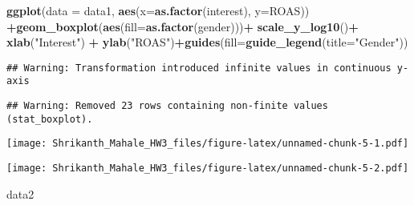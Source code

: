 \documentclass[]{article}
\newenvironment{Shaded}{\begin{snugshade}}{\end{snugshade}}
\newcommand{\KeywordTok}[1]{\textcolor[rgb]{0.13,0.29,0.53}{\textbf{#1}}}
\newcommand{\DataTypeTok}[1]{\textcolor[rgb]{0.13,0.29,0.53}{#1}}
\newcommand{\StringTok}[1]{\textcolor[rgb]{0.31,0.60,0.02}{#1}}
\newcommand{\OperatorTok}[1]{\textcolor[rgb]{0.81,0.36,0.00}{\textbf{#1}}}
\newcommand{\NormalTok}[1]{#1}
\begin{document}
\begin{Shaded}
\begin{Highlighting}[]
\KeywordTok{ggplot}\NormalTok{(}\DataTypeTok{data =}\NormalTok{ data1, }\KeywordTok{aes}\NormalTok{(}\DataTypeTok{x=}\KeywordTok{as.factor}\NormalTok{(interest), }\DataTypeTok{y=}\NormalTok{ROAS)) }\OperatorTok{+}\KeywordTok{geom_boxplot}\NormalTok{(}\KeywordTok{aes}\NormalTok{(}\DataTypeTok{fill=}\KeywordTok{as.factor}\NormalTok{(gender)))}\OperatorTok{+}\StringTok{ }\KeywordTok{scale_y_log10}\NormalTok{()}\OperatorTok{+}\StringTok{ }\KeywordTok{xlab}\NormalTok{(}\StringTok{"Interest"}\NormalTok{) }\OperatorTok{+}\StringTok{ }\KeywordTok{ylab}\NormalTok{(}\StringTok{"ROAS"}\NormalTok{)}\OperatorTok{+}\KeywordTok{guides}\NormalTok{(}\DataTypeTok{fill=}\KeywordTok{guide_legend}\NormalTok{(}\DataTypeTok{title=}\StringTok{"Gender"}\NormalTok{))}
\end{Highlighting}
\end{Shaded}

\begin{verbatim}
## Warning: Transformation introduced infinite values in continuous y-axis
\end{verbatim}

\begin{verbatim}
## Warning: Removed 23 rows containing non-finite values (stat_boxplot).
\end{verbatim}

\texttt{[image: Shrikanth\_Mahale\_HW3\_files/figure-latex/unnamed-chunk-5-1.pdf]}

\begin{Shaded}
\end{Shaded}

\texttt{[image: Shrikanth\_Mahale\_HW3\_files/figure-latex/unnamed-chunk-5-2.pdf]}

\begin{Shaded}
\begin{Highlighting}[]
\NormalTok{data2}
\end{Highlighting}
\end{Shaded}
\end{document}
